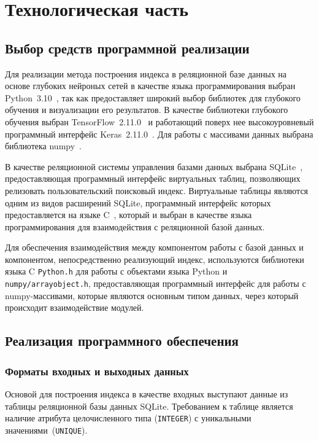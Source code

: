 \chapter{\label{impl}Технологическая часть}

\section{Выбор средств программной реализации}

Для реализации метода построения индекса в реляционной базе данных на основе
глубоких нейроных сетей в качестве языка программирования выбран
Python~3.10~\cite{python}, так как предоставляет широкий выбор библиотек для
глубокого обучения и визуализации его результатов.  В качестве библиотеки
глубокого обучения выбран TensorFlow~2.11.0~\cite{tf} и работающий поверх нее
высокоуровневый программный интерфейс Keras~2.11.0~\cite{keras}.  Для работы с
массивами данных выбрана библиотека numpy~\cite{numpy}.

В качестве реляционной системы управления базами данных выбрана
SQLite~\cite{sqlite}, предоставляющая программный интерфейс виртуальных таблиц,
позволяющих релизовать пользовательский поисковый индекс. Виртуальные таблицы
являются одним из видов расширений SQLite, программный интерфейс которых
предоставляется на языке C~\cite{c}, который и выбран в качестве языка
программирования для взаимодействия с реляционной базой данных.

Для обеспечения взаимодействия между компонентом работы с базой данных и
компонентом, непосредственно реализующий индекс, используются библиотеки языка C
\texttt{Python.h} для работы с объектами языка Python и
\texttt{numpy/arrayobject.h}, предоставляющая программный интерфейс для работы с
numpy-массивами, которые являются основным типом данных, через который
происходит взаимодействие модулей.

\section{Реализация программного обеспечения}

\subsection{Форматы входных и выходных данных}

Основой для построения индекса в качестве входных выступают данные из таблицы
реляционной базы данных SQLite. Требованием к таблице является наличие атрибута
целочисленного типа (\texttt{INTEGER}) с уникальными
значениями~(\texttt{UNIQUE}).

